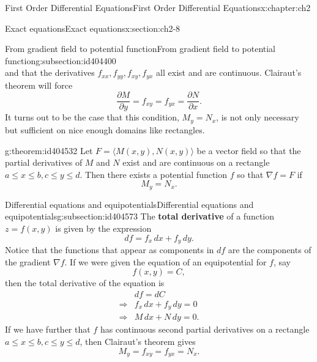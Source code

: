 \documentclass[oneside,10pt,]{book}
\newcommand{\terminology}[1]{\textbf{#1}}
\numberwithin{equation}{section}
\numberwithin{equation}{section}
\newcommand{\amp}{&}
\begin{document}
\begin{chapterptx}{First Order Differential Equations}{}{First Order Differential Equations}{}{}{x:chapter:ch2}
\begin{sectionptx}{Exact equations}{}{Exact equations}{}{}{x:section:ch2-8}
\begin{subsectionptx}{From gradient field to potential function}{}{From gradient field to potential function}{}{}{g:subsection:id404400}
\begin{equation*}
\end{equation*}
and that the derivatives \(f_{xx}, f_{yy}, f_{xy}, f_{yx}\) all exist and are continuous. Clairaut's theorem will force%
\begin{equation*}
\frac{\partial M}{\partial y} = f_{xy} = f_{yx} = \frac{\partial N}{\partial x}\text{.}
\end{equation*}
It turns out to be the case that this condition, \(M_y = N_x\), is not only necessary but sufficient on nice enough domains like rectangles.%
\begin{theorem}{}{}{g:theorem:id404532}%
Let \(F = \langle M(x,y), N(x,y) \rangle\) be a vector field so that the partial derivatives of \(M\) and \(N\) exist and are continuous on a rectangle \(a \leq x \leq b, c \leq y \leq d\). Then there exists a potential function \(f\) so that \(\nabla f = F\) if%
\begin{equation*}
M_y = N_x.
\end{equation*}
%
\end{theorem}
\end{subsectionptx}
%
%
\typeout{************************************************}
\typeout{************************************************}
%
\begin{subsectionptx}{Differential equations and equipotentials}{}{Differential equations and equipotentials}{}{}{g:subsection:id404573}
The \terminology{total derivative} of a function \(z = f(x,y)\) is given by the expression%
\begin{equation*}
df = f_x \, dx + f_y \, dy.
\end{equation*}
Notice that the functions that appear as components in \(df\) are the components of the gradient \(\nabla f\). If we were given the equation of an equipotential for \(f\), say%
\begin{equation*}
f(x, y) = C,
\end{equation*}
then the total derivative of the equation is%
\begin{align*}
\amp df = dC \\
\Rightarrow \amp f_x \, dx + f_y \, dy = 0\\
\Rightarrow \amp M \, dx + N \, dy = 0.
\end{align*}
If we have further that \(f\) has continuous second partial derivatives on a rectangle \(a \leq x \leq b, c \leq y \leq d\), then Clairaut's theorem gives%
\begin{equation*}
M_y = f_{xy} = f_{yx} = N_x.
\end{equation*}

\end{subsectionptx}
\end{sectionptx}
\end{chapterptx}
\end{document}
